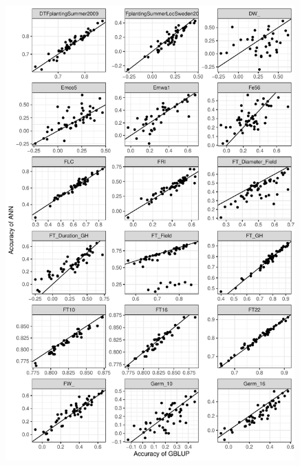 \begin{figure}[H]
  \centering \includegraphics[height=0.99\textheight, width=0.99\textwidth]{Figures/gray_cor_plots_3}
  \decoRule
 \label{fig:bla}
\end{figure}

